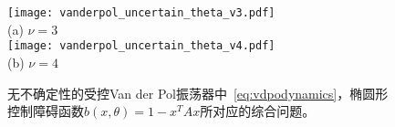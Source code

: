 \begin{figure}
    \centering
    \texttt{[image: vanderpol\_uncertain\_theta\_v3.pdf]} \\
    (a) $\nu = 3$ \\

    \texttt{[image: vanderpol\_uncertain\_theta\_v4.pdf]} \\
    (b) $\nu = 4$

    \caption{
        无不确定性的受控Van der Pol振荡器中~\eqref{eq:vdpodynamics}，椭圆形控制障碍函数$b(x,\theta) = 1 - x^T A x$所对应的综合问题。
        \label{fig:vanderpol_uncertain}
    }
\end{figure}

